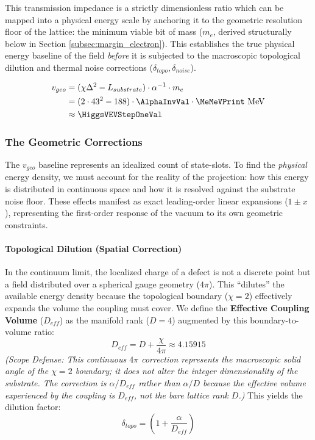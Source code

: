 This transmission impedance is a strictly dimensionless ratio which can be mapped into a physical energy scale by anchoring it to the geometric resolution floor of the lattice: the minimum viable bit of mass ($m_e$, derived structurally below in Section \ref{subsec:margin_electron}). This establishes the true physical energy baseline of the field \textit{before} it is subjected to the macroscopic topological dilution and thermal noise corrections ($\delta_{topo}, \delta_{noise}$).

\begin{equation}
\begin{split}
v_{geo} &= (\chi \Delta^2 - L_{substrate}) \cdot \alpha^{-1} \cdot m_e \\
&= (2 \cdot 43^2 - 188) \cdot \AlphaInvVal \cdot \MeMeVPrint \text{ MeV} \\
&\approx \HiggsVEVStepOneVal
\end{split}
\end{equation}

\subsubsection{The Geometric Corrections}
The $v_{geo}$ baseline represents an idealized count of state-slots. To find the \textit{physical} energy density, we must account for the reality of the projection: how this energy is distributed in continuous space and how it is resolved against the substrate noise floor. These effects manifest as exact leading-order linear expansions ($1 \pm x$), representing the first-order response of the vacuum to its own geometric constraints.

\paragraph{Topological Dilution (Spatial Correction)}
In the continuum limit, the localized charge of a defect is not a discrete point but a field distributed over a spherical gauge geometry ($4\pi$). This ``dilutes'' the available energy density because the topological boundary ($\chi=2$) effectively expands the volume the coupling must cover. We define the \textbf{Effective Coupling Volume} ($D_{eff}$) as the manifold rank ($D=4$) augmented by this boundary-to-volume ratio:
\begin{equation}
D_{eff} = D + \frac{\chi}{4\pi} \approx 4.15915
\end{equation}
\textit{(Scope Defense: This continuous $4\pi$ correction represents the macroscopic solid angle of the $\chi=2$ boundary; it does not alter the integer dimensionality of the substrate. The correction is $\alpha/D_{eff}$ rather than $\alpha/D$ because the effective volume experienced by the coupling is $D_{eff}$, not the bare lattice rank $D$.)} This yields the dilution factor:
\begin{equation}
\delta_{topo} = \left( 1 + \frac{\alpha}{D_{eff}} \right)
\end{equation}

